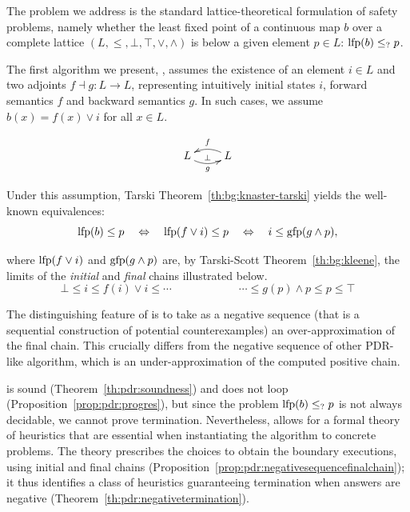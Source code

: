The problem we address is the standard lattice-theoretical formulation of safety problems, namely whether the least fixed point of a continuous map $b$ over a complete lattice $(L, \le, \bot, \top, \lor, \land)$ is below a given element $p \in L$: $\text{lfp} (b) \leq_{?} p$.

The first algorithm we present, \APDR{}, assumes the existence of an element $i \in L$ and two adjoints $f \dashv g \colon L \to L$, representing intuitively initial states $i$, forward semantics $f$ and backward semantics $g$. In such cases, we assume $b(x) = f(x) \lor i$ for all $x \in L$.

\[
\xymatrix{
L \ar@/_1.5ex/[r]_-{g}^-\bot &L\ar@/_1.5ex/[l]_-{f}
}
\]

Under this assumption, Tarski Theorem~\ref{th:bg:knaster-tarski} yields the well-known equivalences:
\[
\text{lfp} (b)\le p
\quad \Leftrightarrow\quad
\text{lfp} (f\lor i)\le p
\quad \Leftrightarrow\quad
i \le \text{gfp} (g \land p),
\]

where $\text{lfp} (f\lor i)$  and $\text{gfp} (g \land p)$ are, by Tarski-Scott Theorem~\ref{th:bg:kleene}, the limits of the \emph{initial} and \emph{final} chains illustrated below.
\[
\bot \le i \le f(i)\lor i \le  \cdots
\qquad\qquad\qquad
\cdots \le g(p)\land p \le p \le \top
\]

The distinguishing feature of \APDR{} is to take as a negative sequence (that is a sequential construction of potential counterexamples) an over-approximation of the final chain. This crucially differs from the negative sequence of other PDR-like algorithm, which is an under-approximation of the computed positive chain.

\APDR{} is sound (Theorem~\ref{th:pdr:soundness}) and does not loop (Proposition~\ref{prop:pdr:progres}), but since the problem $\text{lfp} (b) \le_? p$ is not always decidable, we cannot prove termination. Nevertheless, \APDR{} allows for a formal theory of heuristics that are essential when instantiating the algorithm to concrete problems. The theory prescribes the choices to obtain the boundary executions, using initial and final chains (Proposition~\ref{prop:pdr:negativesequencefinalchain}); it thus identifies a class of heuristics guaranteeing termination when answers are negative (Theorem~\ref{th:pdr:negativetermination}).

